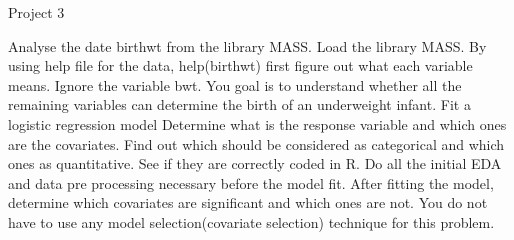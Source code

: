 Project 3

Analyse the date birthwt from the library MASS. Load the library MASS. By using help file for the data, help(birthwt) first figure out what each variable means.
Ignore the variable bwt. You goal is to understand whether all the remaining variables can determine the birth of an underweight infant. Fit a logistic regression model
Determine what is the response variable and which ones are the covariates. Find out which should be considered as categorical and which ones as quantitative. See
if they are correctly coded in R. Do all the initial EDA and data pre processing necessary before the model fit. After fitting the model, determine which covariates 
are significant and which ones are not. You do not have to use any model selection(covariate selection) technique for this problem.